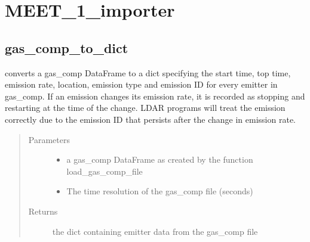 \documentclass[letterpaper,10pt,english]{sphinxmanual}
\begin{document}
\section{MEET\_1\_importer}
\label{\detokenize{index:module-feast.MEET_1_importer}}\label{\detokenize{index:meet-1-importer}}

\subsection{gas\_comp\_to\_dict}
\label{\detokenize{index:gas-comp-to-dict}}

\begin{fulllineitems}
\label{\detokenize{index:feast.MEET_1_importer.gas_comp_to_dict}}
converts a gas\_comp DataFrame to a dict specifying the start time, top time, emission rate, location,
emission type and emission ID for every emitter in gas\_comp. If an emission changes its emission rate,
it is recorded as stopping and restarting at the time of the change. LDAR programs will treat the emission
correctly due to the emission ID that persists after the change in emission rate.
\begin{quote}\begin{description}
\item[{Parameters}] \leavevmode\begin{itemize}
\item {} 
 \textendash{} a gas\_comp DataFrame as created by the function load\_gas\_comp\_file

\item {} 
 \textendash{} The time resolution of the gas\_comp file (seconds)

\end{itemize}

\item[{Returns}] \leavevmode
the dict containing emitter data from the gas\_comp file

\end{description}\end{quote}

\end{fulllineitems}
\end{document}
